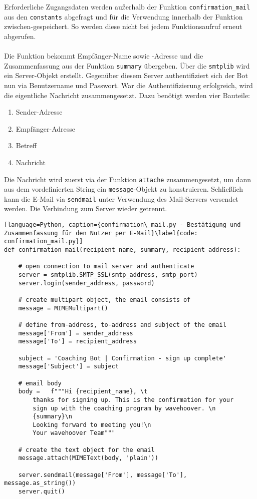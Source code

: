             Erforderliche Zugangsdaten werden außerhalb der Funktion \verb|confirmation_mail| aus den \verb|constants| abgefragt und für die Verwendung innerhalb der Funktion zwischen-gespeichert. So werden diese nicht bei jedem Funktionsaufruf erneut abgerufen.\\
            \\
            Die Funktion bekommt Empfänger-Name sowie -Adresse und die Zusammenfassung aus der Funktion \verb|summary| übergeben. Über die \verb|smtplib| wird ein Server-Objekt erstellt. Gegenüber diesem Server authentifiziert sich der Bot nun via Benutzername und Passwort. War die Authentifizierung erfolgreich, wird die eigentliche Nachricht zusammengesetzt. Dazu benötigt werden vier Bauteile: 
            \begin{enumerate}
                \item Sender-Adresse
                \item Empfänger-Adresse
                \item Betreff
                \item Nachricht
            \end{enumerate}
            Die Nachricht wird zuerst via der Funktion \verb|attache| zusammengesetzt, um dann aus dem vordefinierten String ein \verb|message|-Objekt zu konstruieren. Schließlich kann die E-Mail via \verb|sendmail| unter Verwendung des Mail-Servers versendet werden. Die Verbindung zum Server wieder getrennt.

            \begin{lstlisting}[language=Python, caption={confirmation\_mail.py - Bestätigung und Zusammenfassung für den Nutzer per E-Mail}\label{code: confirmation_mail.py}]
def confirmation_mail(recipient_name, summary, recipient_address):

    # open connection to mail server and authenticate
    server = smtplib.SMTP_SSL(smtp_address, smtp_port)
    server.login(sender_address, password)

    # create multipart object, the email consists of
    message = MIMEMultipart()

    # define from-address, to-address and subject of the email
    message['From'] = sender_address
    message['To'] = recipient_address

    subject = 'Coaching Bot | Confirmation - sign up complete'
    message['Subject'] = subject

    # email body
    body =   f"""Hi {recipient_name}, \t
        thanks for signing up. This is the confirmation for your 
        sign up with the coaching program by wavehoover. \n 
        {summary}\n
        Looking forward to meeting you!\n
        Your wavehoover Team"""
    
    # create the text object for the email
    message.attach(MIMEText(body, 'plain'))

    server.sendmail(message['From'], message['To'], message.as_string())
    server.quit()
            \end{lstlisting}


